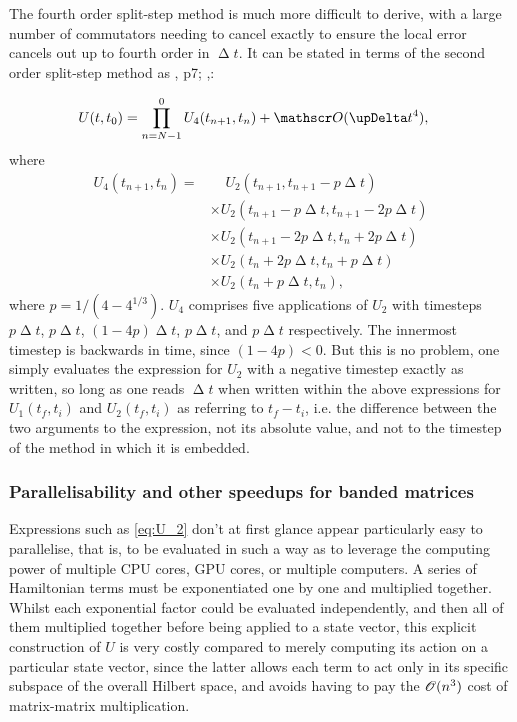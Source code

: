 The fourth order split-step method is much more difficult to derive, with a large number of commutators needing to cancel exactly to ensure the local error cancels out up to fourth order in $\upDelta t$. It can be stated in terms of the second order split-step method as 
\citeleft{}, p7; ,\citeright:

\begin{align}
U(t, t_0) &= \prod_{n=N-1}^0 U_4(t_{n+1}, t_n) + \Ord{\upDelta t^4},
\end{align}
where
\begin{align}\label{eq:U_4}
U_4(t_{n+1}, t_n) =
&\phantom{\times}
U_2(t_{n+1}, t_{n+1} - p\upDelta t)\nonumber\\
&\times
U_2(t_{n+1} - p\upDelta t, t_{n+1} - 2p\upDelta t)\nonumber\\
&\times
U_2(t_{n+1} - 2p\upDelta t, t_n + 2p\upDelta t)\nonumber\\
&\times
U_2(t_n + 2p\upDelta t, t_n + p\upDelta t)\nonumber\\
&\times
U_2(t_n + p\upDelta t, t_n),
\end{align}
where $p = 1/(4 - 4^{1/3})$. $U_4$ comprises five applications of $U_2$ with timesteps $p\upDelta t$, $p\upDelta t$, $(1 - 4p)\upDelta t$, $p\upDelta t$, and $p\upDelta t$ respectively. The innermost timestep is backwards in time, since $(1 - 4p) < 0$. But this is no problem, one simply evaluates the expression for $U_2$ with a negative timestep exactly as written, so long as one reads $\upDelta t$ when written within the above expressions for $U_1(t_f, t_i)$ and $U_2(t_f, t_i)$ as referring to $t_f - t_i$, i.e. the difference between the two arguments to the expression, not its absolute value, and not to the timestep of the method in which it is embedded.

\subsubsection{Parallelisability and other speedups for banded matrices}\label{sec:split-step-parallel}

Expressions such as \eqref{eq:U_2} don't at first glance appear particularly easy to parallelise, that is, to be evaluated in such a way as to leverage the computing power of multiple CPU cores, GPU cores, or multiple computers. A series of Hamiltonian terms must be exponentiated one by one and multiplied together. Whilst each exponential factor could be evaluated independently, and then all of them multiplied together before being applied to a state vector, this explicit construction of $U$ is very costly compared to merely computing its action on a particular state vector, since the latter allows each term to act only in its specific subspace of the overall Hilbert space, and avoids having to pay the $\mathscr{O}(n^3)$ cost of matrix-matrix multiplication.

